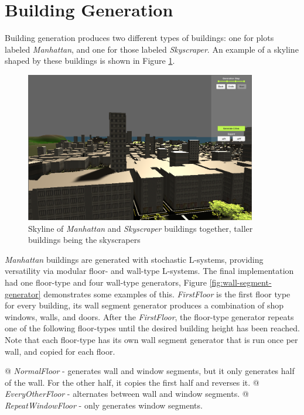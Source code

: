 \section{Building Generation}

Building generation produces two different types of buildings: one for plots labeled \textit{Manhattan}, and one for those labeled \textit{Skyscraper}. 
An example of a skyline shaped by these buildings is shown in Figure \ref{fig:skyline-result}.

\begin{figure}[H]
  \centering

  \includegraphics[width=0.9\textwidth]{figure/skyline.PNG}
  \caption{Skyline of \textit{Manhattan} and \textit{Skyscraper} buildings together, taller buildings being the skyscrapers}

  \label{fig:skyline-result}
\end{figure}

\textit{Manhattan} buildings are generated with stochastic L-systems, providing versatility via modular floor- and wall-type L-systems.
The final implementation had one floor-type and four wall-type generators, Figure \ref{fig:wall-segment-generator} demonstrates some examples of this.
\textit{FirstFloor} is the first floor type for every building, its wall segment generator produces a combination of shop windows, walls, and doors.
After the \textit{FirstFloor}, the floor-type generator repeats one of the following floor-types until the desired building height has been reached.
Note that each floor-type has its own wall segment generator that is run once per wall, and copied for each floor. 

\begin{easylist}
  @ \textit{NormalFloor} - generates wall and window segments, but it only generates half of the wall. For the other half, it copies the first half and reverses it. 
  @ \textit{EveryOtherFloor} - alternates between wall and window segments.
  @ \textit{RepeatWindowFloor} - only generates window segments.
\end{easylist}

